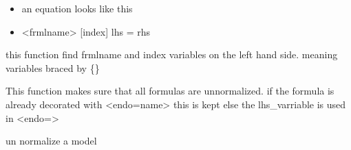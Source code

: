 \documentclass[letterpaper,10pt,english]{sphinxmanual}
\begin{document}
\begin{fulllineitems}
\label{\detokenize{onboard/modelmanipulation:modelmanipulation.findindex_gams}}
\pysigstartsignatures
{}
\pysigstopsignatures\begin{itemize}
\item {} 
\sphinxAtStartPar
an equation looks like this

\item {} 
\sphinxAtStartPar
\textless{}frmlname\textgreater{} {[}index{]} lhs = rhs

\end{itemize}

\sphinxAtStartPar
this function find frmlname and index variables on the left hand side. meaning variables braced by \{\}

\end{fulllineitems}


\begin{fulllineitems}
\label{\detokenize{onboard/modelmanipulation:modelmanipulation.un_normalize_expression}}
\pysigstartsignatures
{}
\pysigstopsignatures
\sphinxAtStartPar
This function makes sure that all formulas are unnormalized.
if the formula is already decorated with \textless{}endo=name\textgreater{} this is kept
else the lhs\_varriable is used in \textless{}endo=\textgreater{}

\end{fulllineitems}


\begin{fulllineitems}
\label{\detokenize{onboard/modelmanipulation:modelmanipulation.un_normalize_model}}
\pysigstartsignatures
{}
\pysigstopsignatures
\sphinxAtStartPar
un normalize a model

\end{fulllineitems}
\end{document}
